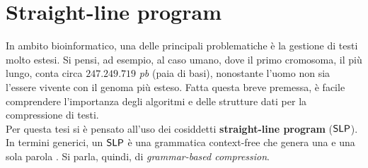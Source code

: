 \section{Straight-line program}
\label{slpsec}
In ambito bioinformatico, una delle principali problematiche è la
gestione di testi molto estesi. Si pensi, ad esempio, al caso umano, dove il
primo cromosoma, il più lungo, conta circa $247.249.719$
\textit{pb} (paia di basi), nonostante l'uomo
non sia l'essere vivente con il genoma più esteso. Fatta questa breve
premessa, è facile comprendere l'importanza degli algoritmi e delle strutture
dati per la compressione di testi.\\
Per questa tesi si è pensato all'uso dei cosiddetti \textbf{straight-line
  program} ($\mbox{\rm {\sf SLP}}$). In termini 
generici, un $\mbox{\rm {\sf SLP}}$ è una grammatica context-free che 
genera una e una sola parola \cite{slpsurvey}. Si parla, quindi, di
\textit{grammar-based compression}.
